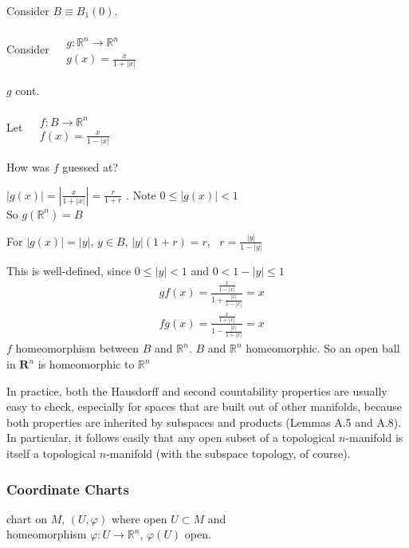 \documentclass[11pt]{amsart}
\theoremstyle{definition}
\begin{document}
Consider $B \equiv B_1(0)$.

Consider $\begin{aligned} & \quad \\
  & g: \mathbb{R}^n \to \mathbb{R}^n \\
  & g(x) = \frac{x}{ 1 + |x| } \end{aligned}$

$g$ cont.

Let $\begin{aligned} & \quad \\
  & f:B \to \mathbb{R}^n \\
  & f(x) = \frac{x}{ 1 - |x| } \end{aligned} $

How was $f$ guessed at?

$|g(x) | = \left| \frac{x}{1 + |x| } \right| = \frac{r}{ 1 + r}$ .  Note $0 \leq |g(x) | <1$ \\
So $g(\mathbb{R}^n) = B$

For $|g(x)| = |y|$, $y \in B$, $|y|(1+r) = r$, \, $r = \frac{ |y| }{ 1 - |y| }$

This is well-defined, since $0 \leq |y| < 1$ and $0 < 1 - |y| \leq 1$
\[
\begin{aligned}
  & gf(x) =\frac{  \frac{ x}{ 1 - |x| } }{ 1 + \frac{|x|}{ 1 - |x| } } = x \\
  & fg(x) = \frac{ \frac{x}{ 1 + |x| } }{ 1 - \frac{|x| }{ 1 + |x| } } = x
\end{aligned}
\]
$f$ homeomorphism between $B$ and $\mathbb{R}^n$.  $B$ and $\mathbb{R}^n$ homeomorphic.  So an open ball in $\mathbf{R}^n$ is homeomorphic to $\mathbb{R}^n$

\hrulefill

In practice, both the Hausdorff and second countability properties are usually easy to check, especially for spaces that are built out of other manifolds, because both properties are inherited by subspaces and products (Lemmas A.5 and A.8).  In particular, it follows easily that any open subset of a topological $n$-manifold is itself a topological $n$-manifold (with the subspace topology, of course).

\subsubsection*{Coordinate Charts}

chart on $M$, $(U, \varphi)$ where open $U \subset M$ and \\
homeomorphism $\varphi : U \to \mathbb{R}^n$, $\varphi(U)$ open.
\end{document}
